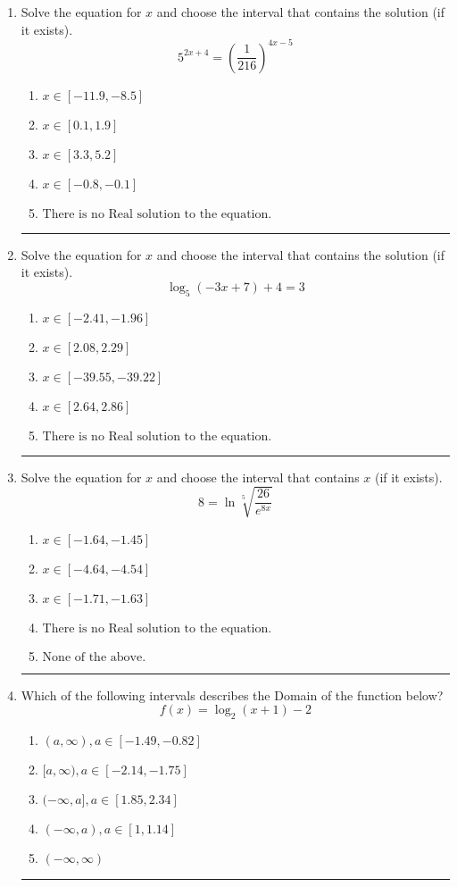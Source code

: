 \documentclass[14pt]{extbook}
\newcommand{\litem}[1]{\item#1\hspace*{-1cm}\rule{\textwidth}{0.4pt}}
\begin{document}
\begin{enumerate}
{\begin{enumerate}[label=\Alph*.]
\end{enumerate} }
\litem{
Solve the equation for $x$ and choose the interval that contains the solution (if it exists).\[ 5^{2x+4} = \left(\frac{1}{216}\right)^{4x-5} \]\begin{enumerate}[label=\Alph*.]
\item \( x \in [-11.9, -8.5] \)
\item \( x \in [0.1, 1.9] \)
\item \( x \in [3.3, 5.2] \)
\item \( x \in [-0.8, -0.1] \)
\item \( \text{There is no Real solution to the equation.} \)

\end{enumerate} }
\litem{
Solve the equation for $x$ and choose the interval that contains the solution (if it exists).\[ \log_{5}{(-3x+7)}+4 = 3 \]\begin{enumerate}[label=\Alph*.]
\item \( x \in [-2.41, -1.96] \)
\item \( x \in [2.08, 2.29] \)
\item \( x \in [-39.55, -39.22] \)
\item \( x \in [2.64, 2.86] \)
\item \( \text{There is no Real solution to the equation.} \)

\end{enumerate} }
\litem{
 Solve the equation for $x$ and choose the interval that contains $x$ (if it exists).\[  8 = \ln{\sqrt[5]{\frac{26}{e^{8x}}}} \]\begin{enumerate}[label=\Alph*.]
\item \( x \in [-1.64, -1.45] \)
\item \( x \in [-4.64, -4.54] \)
\item \( x \in [-1.71, -1.63] \)
\item \( \text{There is no Real solution to the equation.} \)
\item \( \text{None of the above.} \)

\end{enumerate} }
\litem{
Which of the following intervals describes the Domain of the function below?\[ f(x) = \log_2{(x+1)}-2 \]\begin{enumerate}[label=\Alph*.]
\item \( (a, \infty), a \in [-1.49, -0.82] \)
\item \( [a, \infty), a \in [-2.14, -1.75] \)
\item \( (-\infty, a], a \in [1.85, 2.34] \)
\item \( (-\infty, a), a \in [1, 1.14] \)
\item \( (-\infty, \infty) \)


\end{enumerate}}
\end{enumerate}
\end{document}
